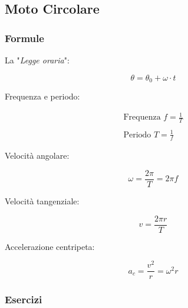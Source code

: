 \subsection{Moto Circolare}

\subsubsection{Formule}

\setcounter{equation}{0}

La "\textit{Legge oraria}":

\begin{equation}
\theta=\theta_0+\omega\cdot t
\end{equation}

Frequenza e periodo:

\begin{equation}
\begin{array}{ll}
\textrm{Frequenza }f=\frac{1}{T} \\
\\
\textrm{Periodo }T=\frac{1}{f}
\end{array}
\end{equation}

Velocità angolare:

\begin{equation}
\omega=\frac{2\pi}{T} = 2\pi f
\end{equation}

Velocità tangenziale:

\begin{equation}
v=\frac{
2\pi r
}{
T
}
\end{equation}

Accelerazione centripeta:


\begin{equation}
a_c=\frac{v^2}{r}=\omega^2 r
\end{equation}




\subsubsection{Esercizi}

